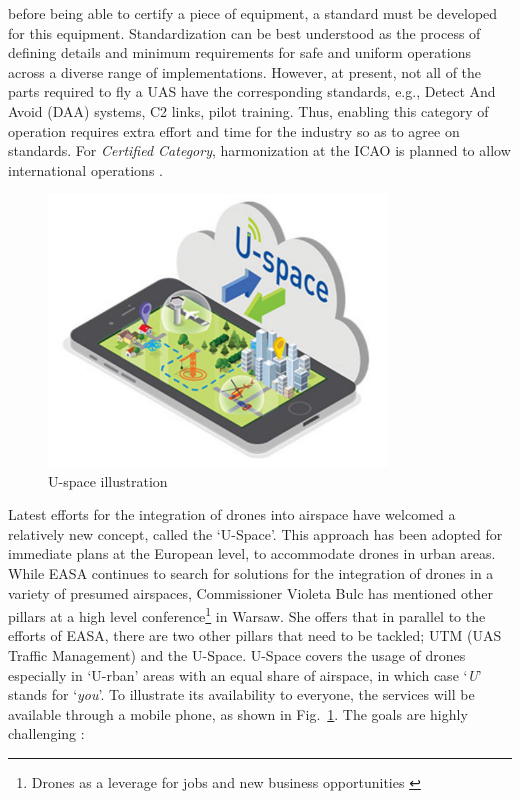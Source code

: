 \begin{itemize}
{before being able to certify a piece of equipment, a standard must be developed for this equipment. 
Standardization can be best understood as the process of defining details and minimum requirements for safe and uniform operations across a diverse range of implementations. 
However, at present, not all of the parts required to fly a UAS have the corresponding standards, e.g., Detect And Avoid (DAA) systems, C2 links, pilot training. 
Thus, enabling this category of operation requires extra effort and time for the industry so as to agree on standards. 
For \emph{Certified Category}, harmonization at the ICAO is planned to allow international operations \cite{manfredi2018unmanned}.}
\end{itemize}

\begin{figure}
\begin{center}
\includegraphics[width=9cm]{figures/USpacePortable}    %
\caption{U-space illustration \cite{UTMairspace}} 
\label{fig:USpacePortable}
\end{center}
\end{figure}

Latest efforts for the integration of drones into airspace have welcomed a relatively new concept, called the `U-Space'. 
This approach has been adopted for immediate plans at the European level, to accommodate drones in urban areas. 
While EASA continues to search for solutions for the integration of drones in a variety of presumed airspaces, Commissioner Violeta Bulc has mentioned other pillars at a high level conference\footnote{Drones as a leverage for jobs and new business opportunities \cite{warsawDeclaration}} in Warsaw. 
She offers that in parallel to the efforts of EASA, there are two other pillars that need to be tackled; UTM (UAS Traffic Management) and the U-Space.
U-Space covers the usage of drones especially in `U-rban' areas with an equal share of airspace, in which case `\emph{U}' stands for `\emph{you}'.
To illustrate its availability to everyone, the services will be available through a mobile phone, as shown in Fig.~\ref{fig:USpacePortable}.
The goals are highly challenging \cite{UTMairspace}:

